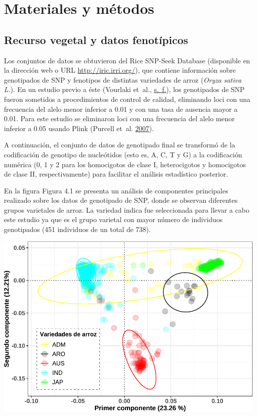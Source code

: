 \documentclass[11pt,spanish,a4paper,oneside,]{book} %
\begin{document}
\clearpage\null\thispagestyle{empty}

\hypertarget{materiales-y-muxe9todos}{%
\chapter{Materiales y métodos}\label{materiales-y-muxe9todos}}

\hypertarget{recurso-vegetal-y-datos-fenotuxedpicos}{%
\section{Recurso vegetal y datos fenotípicos}\label{recurso-vegetal-y-datos-fenotuxedpicos}}

Los conjuntos de datos se obtuvieron del Rice SNP-Seek Database (disponible en la dirección web o URL \url{http://iric.irri.org/}), que contiene información sobre genotipados de SNP y fenotipos de distintas variedades de arroz (\emph{Oryza sativa L.}). En un estudio previo a éste (Vourlaki et~al., \protect\hyperlink{ref-cite:26}{s.~f.}), los genotipados de SNP fueron sometidos a procedimientos de control de calidad, eliminando loci con una frecuencia del alelo menor inferior a 0.01 y con una tasa de ausencia mayor a 0.01. Para este estudio se eliminaron loci con una frecuencia del alelo menor inferior a 0.05 usando Plink (Purcell et~al. \protect\hyperlink{ref-cite:49}{2007}).

A continuación, el conjunto de datos de genotipado final se transformó de la codificación de genotipo de nucleótidos (esto es, A, C, T y G) a la codificación numérica (0, 1 y 2 para los homocigotos de clase I, heterocigotos y homocigotos de clase II, respectivamente) para facilitar el análisis estadístico posterior.

En la figura Figura 4.1 se presenta un análisis de componentes principales realizado sobre los datos de genotipado de SNP, donde se observan diferentes grupos varietales de arroz. La variedad indica fue seleccionada para llevar a cabo este estudio ya que es el grupo varietal con mayor número de individuos genotipados (451 individuos de un total de 738).

\begin{center}\includegraphics[width=1\linewidth]{figures/Graf_PCA} \end{center}
\end{document}
